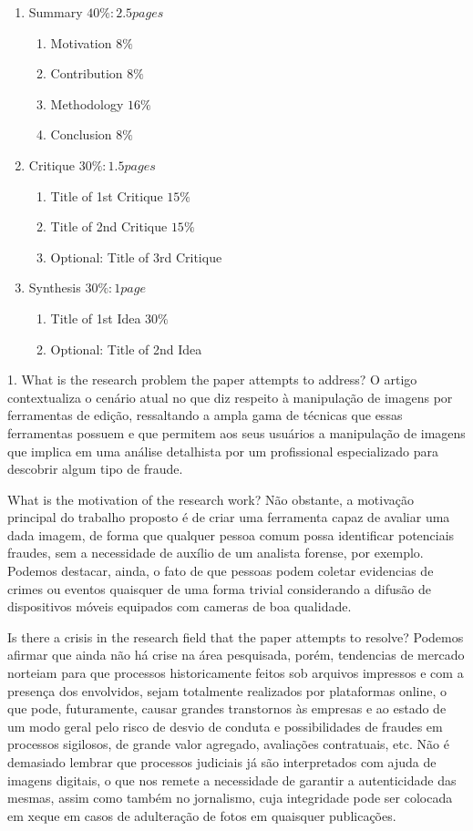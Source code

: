 \begin{enumerate}
  \item Summary \(40\% : 2.5 pages\)
    \begin{enumerate}[label*=\arabic*.]
      \item Motivation \(8\%\)
      \item Contribution \(8\%\)
      \item Methodology \(16\%\)
      \item Conclusion \(8\%\)
    \end{enumerate}
  \item Critique \(30\% : 1.5 pages\)
    \begin{enumerate}[label*=\arabic*.]
      \item Title of 1st Critique \(15\%\)
       \item Title of 2nd Critique \(15\%\)
       \item Optional: Title of 3rd Critique
    \end{enumerate}
  \item Synthesis \(30\% : 1 page\)
    \begin{enumerate}[label*=\arabic*.]
      \item Title of 1st Idea \(30\%\)
      \item Optional: Title of 2nd Idea
    \end{enumerate}
\end{enumerate}
1. What is the research problem the paper attempts to address?
O artigo contextualiza o cenário atual no que diz respeito à manipulação de imagens 
por ferramentas de edição, ressaltando a ampla gama de técnicas que essas ferramentas
possuem e que permitem aos seus usuários a manipulação de imagens que implica em uma análise
detalhista por um profissional especializado para descobrir algum tipo de fraude.

What is the motivation of the research work?
Não obstante, a motivação principal do trabalho proposto é de criar uma ferramenta capaz de
avaliar uma dada imagem, de forma que qualquer pessoa comum possa identificar potenciais fraudes,
sem a necessidade de auxílio de um analista forense, por exemplo.
Podemos destacar, ainda, o fato de que pessoas podem coletar evidencias de crimes ou 
eventos quaisquer de uma forma trivial considerando a difusão de dispositivos móveis 
equipados com cameras de boa qualidade.

Is there a crisis in the research field that the paper attempts to resolve?
Podemos afirmar que ainda não há crise na área pesquisada, porém, tendencias de mercado
norteiam para que processos historicamente feitos sob arquivos impressos e com a presença
dos envolvidos, sejam totalmente realizados por plataformas online, o que pode, futuramente,
causar grandes transtornos às empresas e ao estado de um modo geral pelo risco de desvio de conduta
e possibilidades de fraudes em processos sigilosos, de grande valor agregado, avaliações contratuais, etc.
Não é demasiado lembrar que processos judiciais já são interpretados com ajuda de imagens digitais, o que 
nos remete a necessidade de garantir a autenticidade das mesmas, assim como também no jornalismo, 
cuja integridade pode ser colocada em xeque em casos de adulteração de fotos em quaisquer publicações.

